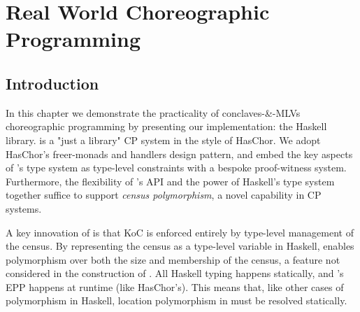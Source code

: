 \chapter{Real World Choreographic Programming}
\label{sec:multichor}




\section{Introduction}
In this chapter we demonstrate the practicality of conclaves-\&-MLVs choreographic programming
by presenting our implementation:
the \MultiChor Haskell library.
\MultiChor is a "just a library" CP system in the style of HasChor.
We adopt HasChor's freer-monads and handlers design pattern,
and embed the key aspects of \HLSCentral's type system as type-level constraints with a bespoke proof-witness system.
Furthermore, the flexibility of \MultiChor's API and the power of Haskell's type system together suffice to support \emph{census polymorphism},
a novel capability in CP systems.

A key innovation of \HLSCentral is that KoC is enforced entirely
by type-level management of the census.
By representing the census as a type-level variable in Haskell,
\MultiChor enables polymorphism over both the size and membership of the census,
a feature not considered in the construction of \HLSCentral.
All Haskell typing happens statically, and \MultiChor's EPP happens at runtime (like HasChor's).
This means that, like other cases of polymorphism in Haskell, location polymorphism in \MultiChor must be resolved statically.

